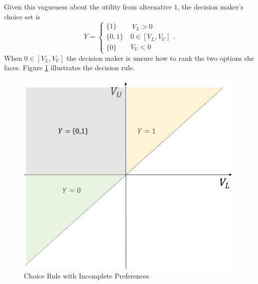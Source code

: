 \documentclass[reqno]{article}
\begin{document}
Given this vagueness about the utility from alternative $1$, the decision maker's choice set is
\begin{equation*}
Y=\left\{ \begin{array}{c}
\{1\} \\ 
\{0,1\} \\ 
\{0\}
\end{array}
\ 
\begin{array}{c}
\ V_{L}>0 \\ 
0\in \left[ V_{L},V_{U}\right] \\ 
V_{U}<0%
\end{array}%
\right. .
\end{equation*}%
When $0\in \left[ V_{L},V_{U}\right] $ the decision maker is unsure how to
rank the two options she faces. Figure \ref{fig:choicerule} illustrates the
decision rule.

\begin{figure}[h!]
    \centering
    \includegraphics[scale=0.6]{choicerule}
    \caption{Choice Rule with Incomplete Preferences}
    \label{fig:choicerule}
\end{figure}
\end{document}
